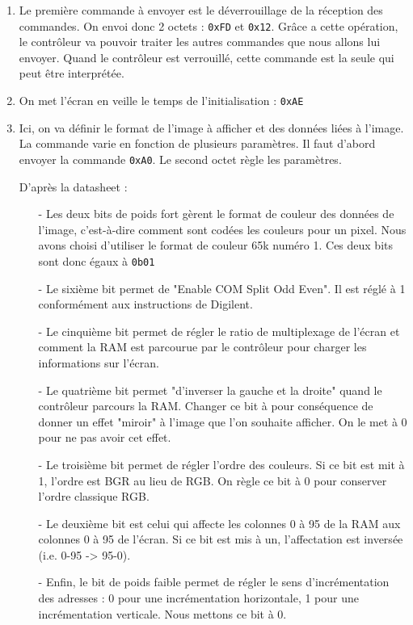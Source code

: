\documentclass[11pt]{article}
\begin{document}
\begin{enumerate}
    \item Le première commande à envoyer est le déverrouillage de la réception des commandes. On envoi donc 2 octets : \texttt{0xFD} et \texttt{0x12}. Grâce a cette opération, le contrôleur va pouvoir traiter les autres commandes que nous allons lui envoyer. Quand le contrôleur est verrouillé, cette commande est la seule qui peut être interprétée. 

    \item On met l'écran en veille le temps de l'initialisation : \texttt{0xAE}

    \item Ici, on va définir le format de l'image à afficher et des données liées à l'image. La commande varie en fonction de plusieurs paramètres. Il faut d'abord envoyer la commande \texttt{0xA0}. Le second octet règle les paramètres. 

    D'après la datasheet : 
    \begin{itemize}
        \item[-] Les deux bits de poids fort gèrent le format de couleur des données de l'image, c'est-à-dire comment sont codées les couleurs pour un pixel. Nous avons choisi d'utiliser le format de couleur 65k numéro 1. Ces deux bits sont donc égaux à \texttt{0b01}
        \item[-] Le sixième bit permet de "Enable COM Split Odd Even". Il est réglé à 1 conformément aux instructions de Digilent. 
        \item[-] Le cinquième bit permet de régler le ratio de multiplexage de l'écran et comment la RAM est parcourue par le contrôleur pour charger les informations sur l'écran. %
        \item[-] Le quatrième bit permet "d'inverser la gauche et la droite" quand le contrôleur parcours la RAM. Changer ce bit à pour conséquence de donner un effet "miroir" à l'image que l'on souhaite afficher. On le met à 0 pour ne pas avoir cet effet. 
        \item[-] Le troisième bit permet de régler l'ordre des couleurs. Si ce bit est mit à 1, l'ordre est BGR au lieu de RGB. On règle ce bit à 0 pour conserver l'ordre classique RGB. 
        \item[-] Le deuxième bit est celui qui affecte les colonnes 0 à 95 de la RAM aux colonnes 0 à 95 de l'écran. Si ce bit est mis à un, l'affectation est inversée (i.e. 0-95 -> 95-0).
        \item[-] Enfin, le bit de poids faible permet de régler le sens d'incrémentation des adresses : 0 pour une incrémentation horizontale, 1 pour une incrémentation verticale. Nous mettons ce bit à 0. 
    \end{itemize}


\end{enumerate}
\end{document}

